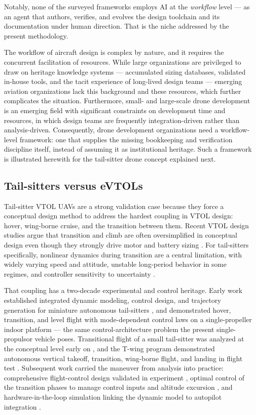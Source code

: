 Notably, none of the surveyed frameworks employs AI at the
\emph{workflow} level --- as an agent that authors, verifies, and
evolves the design toolchain and its documentation under human
direction. That is the niche addressed by the present methodology.

The workflow of aircraft design is complex by nature, and it requires
the concurrent facilitation of resources. While large organizations are
privileged to draw on heritage knowledge systems --- accumulated
sizing databases, validated in-house tools, and the tacit experience of
long-lived design teams --- emerging aviation organizations lack this
background and these resources, which further complicates the
situation. Furthermore, small- and large-scale drone development is an
emerging field with significant constraints on development time and
resources, in which design teams are frequently integration-driven
rather than analysis-driven. Consequently, drone development
organizations need a workflow-level framework: one that supplies the
missing bookkeeping and verification discipline itself, instead of
assuming it as institutional heritage. Such a framework is illustrated
herewith for the tail-sitter drone concept explained next.

\subsection{Tail-sitters versus eVTOLs}

Tail-sitter VTOL UAVs are a strong validation case because they force a
conceptual design method to address the hardest coupling in VTOL
design: hover, wing-borne cruise, and the transition between them.
Recent VTOL design studies argue that transition and climb are often
oversimplified in conceptual design even though they strongly drive
motor and battery sizing \citep{kaneko2024}. For tail-sitters
specifically, nonlinear dynamics during transition are a central
limitation, with widely varying speed and attitude, unstable
long-period behavior in some regimes, and controller sensitivity to
uncertainty \citep{yang2024}.

That coupling has a two-decade experimental and control heritage.
Early work established integrated dynamic modeling, control design,
and trajectory generation for miniature autonomous tail-sitters
\citep{knoebel2006}, and demonstrated hover, transition, and level
flight with mode-dependent control laws on a single-propeller indoor
platform \citep{frank2007} --- the same control-architecture problem
the present single-propulsor vehicle poses. Transitional flight of a
small tail-sitter was analyzed at the conceptual level early on
\citep{kubo2008}, and the T-wing program demonstrated autonomous
vertical takeoff, transition, wing-borne flight, and landing in
flight test \citep{stone2008}. Subsequent work carried the maneuver
from analysis into practice: comprehensive flight-control design
validated in experiment \citep{jung2013}, optimal control of the
transition phases to manage control inputs and altitude excursion
\citep{banazadeh2016}, and hardware-in-the-loop simulation linking
the dynamic model to autopilot integration \citep{sun2017}.

